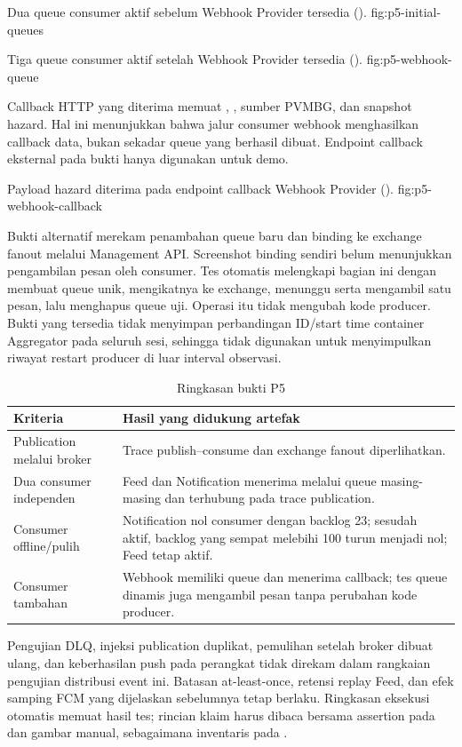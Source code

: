 {Dua queue consumer aktif sebelum Webhook Provider tersedia ().}
{fig:p5-initial-queues}

{Tiga queue consumer aktif setelah Webhook Provider tersedia ().}
{fig:p5-webhook-queue}

Callback HTTP yang diterima memuat , ,
sumber PVMBG, dan snapshot hazard. Hal ini menunjukkan bahwa jalur consumer
webhook menghasilkan callback data, bukan sekadar queue yang berhasil
dibuat. Endpoint callback eksternal pada bukti hanya digunakan untuk demo.

{Payload hazard diterima pada endpoint callback Webhook Provider ().}
{fig:p5-webhook-callback}

Bukti alternatif merekam penambahan queue baru dan binding ke exchange
fanout melalui Management API. Screenshot binding sendiri belum
menunjukkan pengambilan pesan oleh consumer. Tes otomatis
 melengkapi bagian
ini dengan membuat queue unik, mengikatnya ke exchange, menunggu serta
mengambil satu pesan, lalu menghapus queue uji. Operasi itu tidak mengubah
kode producer. Bukti yang tersedia tidak menyimpan perbandingan ID/start
time container Aggregator pada seluruh sesi, sehingga tidak digunakan
untuk menyimpulkan riwayat restart producer di luar interval observasi.

\begin{table}[htbp]
    \centering
    \small
    \caption{Ringkasan bukti P5}
    \begin{tabularx}{\textwidth}{@{}P{0.28\textwidth}X@{}}
        \toprule
        \textbf{Kriteria} & \textbf{Hasil yang didukung artefak} \\
        \midrule
        Publication melalui broker & Trace publish--consume dan exchange fanout diperlihatkan. \\
        Dua consumer independen & Feed dan Notification menerima melalui queue masing-masing dan terhubung pada trace publication. \\
        Consumer offline/pulih & Notification nol consumer dengan backlog 23; sesudah aktif, backlog yang sempat melebihi 100 turun menjadi nol; Feed tetap aktif. \\
        Consumer tambahan & Webhook memiliki queue dan menerima callback; tes queue dinamis juga mengambil pesan tanpa perubahan kode producer. \\
        \bottomrule
    \end{tabularx}
\end{table}

Pengujian DLQ, injeksi publication duplikat, pemulihan setelah broker
dibuat ulang, dan keberhasilan push pada perangkat tidak direkam dalam
rangkaian pengujian distribusi event ini. Batasan at-least-once, retensi replay Feed,
dan efek samping FCM yang dijelaskan sebelumnya tetap berlaku. Ringkasan
eksekusi otomatis memuat hasil tes; rincian klaim harus dibaca bersama assertion
pada  dan gambar manual, sebagaimana
inventaris pada .
